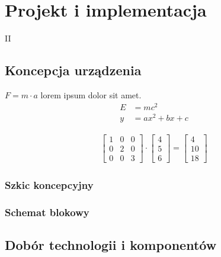 \part{Projekt i implementacja}{II}
\noindent \lipsum[1-3]

\clearpage\chapter{Koncepcja urządzenia}
    \noindent \lipsum[1-3] $F = m \cdot a$ lorem ipsum dolor sit amet.
    \begin{align}
        E & = mc^2 \\
        y & = ax^2 + bx + c
    \end{align}

    \lipsum[4-5]
    \begin{align}
        \begin{bmatrix}
            1 & 0 & 0 \\
            0 & 2 & 0 \\
            0 & 0 & 3
        \end{bmatrix} \cdot
        \begin{bmatrix}
            4 \\
            5 \\
            6
        \end{bmatrix} =
        \begin{bmatrix}
            4  \\
            10 \\
            18
        \end{bmatrix}
    \end{align}


    \section{Szkic koncepcyjny}
        \noindent \lipsum[6-7]

    \section{Schemat blokowy}
        \noindent \lipsum[8-9]

\clearpage\chapter{Dobór technologii i komponentów} 
    \noindent \lipsum[1-3]

